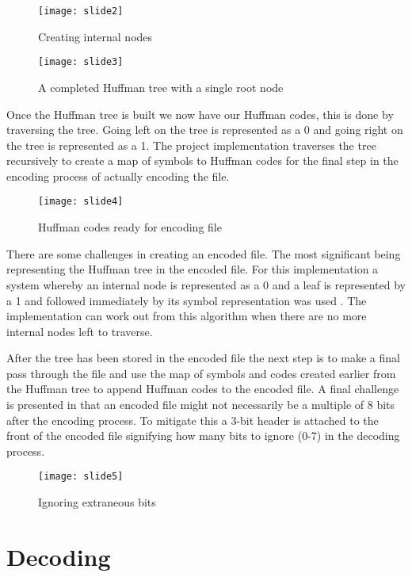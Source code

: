 \begin{figure}[H]
\caption{Creating internal nodes}
\texttt{[image: slide2]}
\centering
\end{figure}


\begin{figure}[H]
\caption{A completed Huffman tree with a single root node}
\texttt{[image: slide3]}
\centering
\end{figure}


\doublespacing
\singlespacing
Once the Huffman tree is built we now have our Huffman codes, this is done by traversing the tree. Going left on the tree is represented as a 0 and going right on the tree is represented as a 1. The project implementation traverses the tree recursively to create a map of symbols to Huffman codes for the final step in the encoding process of actually encoding the file.


\begin{figure}[H]
\caption{Huffman codes ready for encoding file}
\texttt{[image: slide4]}
\centering
\end{figure}


\doublespacing
\singlespacing
There are some challenges in creating an encoded file. The most significant being representing the Huffman tree in the encoded file. For this implementation a system whereby an internal node is represented as a 0 and a leaf is represented by a 1 and followed immediately by its symbol representation was used \cite{GeeksForGeeks}. The implementation can work out from this algorithm when there are no more internal nodes left to traverse.


\doublespacing
\singlespacing
After the tree has been stored in the encoded file the next step is to make a final pass through the file and use the map of symbols and codes created earlier from the Huffman tree to append Huffman codes to the encoded file. A final challenge is presented in that an encoded file might not necessarily be a multiple of 8 bits after the encoding process. To mitigate this a 3-bit header is attached to the front of the encoded file signifying how many bits to ignore (0-7) in the decoding process.


\begin{figure}[H]
\caption{Ignoring extraneous bits}
\texttt{[image: slide5]}
\centering
\end{figure}


\doublespacing
\singlespacing
\section{Decoding}


